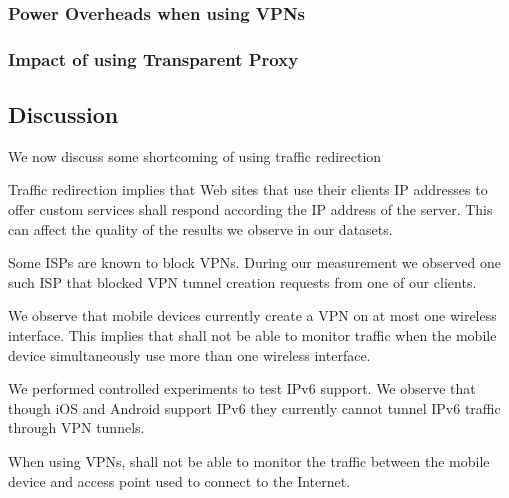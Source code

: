 
\subsubsection{Power Overheads when using VPNs}


\subsubsection{Impact of using Transparent Proxy}


\subsection{Discussion}

We now discuss some shortcoming of using traffic redirection
\begin{packedenumerate}
\item Traffic redirection implies that Web sites that use their clients IP addresses to offer custom services shall respond according the IP address of the \platname server. This can affect the quality of the results we observe in our datasets. 
\item Some ISPs are known to block VPNs. During our measurement we observed one such ISP that blocked VPN tunnel creation requests from one of our clients.
\item We observe that mobile devices currently create a VPN on at most one wireless interface. This implies that \platname shall not be able to monitor traffic when the mobile device simultaneously use more than one wireless interface. 
\item We performed controlled experiments to test IPv6 support. We observe that though iOS and Android support IPv6 they currently cannot tunnel IPv6 traffic through VPN tunnels. 
\item When using VPNs, \platname shall not be able to monitor the traffic between the mobile device and access point used to connect to the Internet.
\end{packedenumerate}






